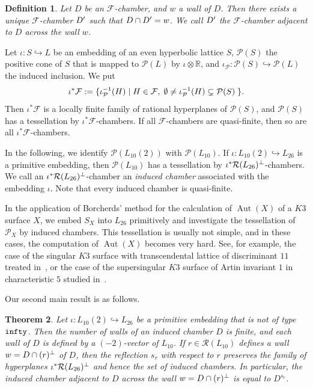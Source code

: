 \documentclass{amsart}
\newtheorem{theorem}{Theorem}[section]
\newtheorem{_definition}[theorem]{Definition}
\newenvironment{definition}{\begin{_definition}\rm}{\end{_definition}}
\numberwithin{equation}{section}
\numberwithin{table}{section}
\numberwithin{figure}{section}
\newcommand{\R}{\mathord{\mathbb R}}
\newcommand{\FFF}{\mathord{\mathcal F}}
\newcommand{\PPP}{\mathord{\mathcal P}}
\newcommand{\RRR}{\mathord{\mathcal R}}
\newcommand{\inj}{\hookrightarrow}
\newcommand{\set}[2]{\{ {#1}\mid {#2}  \}}
\newcommand{\tensor}{\otimes}
\newcommand{\sprime}{\sp\prime}
\newcommand{\sperp}{\sp{\perp}}
\newcommand{\inv}{\sp{-1}}
\newcommand{\Aut}{\operatorname{\mathrm{Aut}}\nolimits}
\begin{document}
%
\begin{definition}
Let $D$  be an $\FFF$-chamber, and $w$ a wall of $D$.
Then there exists a unique $\FFF$-chamber $D\sprime$ such that $D\cap D\sprime=w$.
We call $D\sprime$ the $\FFF$-chamber \emph{adjacent to $D$ across the wall $w$}.
\end{definition}
%
%
Let $\iota\colon S\inj L$ be an embedding
of an even hyperbolic lattice $S$,
$\PPP(S)$  the positive cone of $S$
that is mapped to $\PPP(L)$ by $\iota\tensor \R$,
and
$\iota_{\PPP}\colon \PPP(S)\inj \PPP(L)$
the induced inclusion.
We put
\[
\iota^{*} \FFF:=\set{\iota_{\PPP}\inv (H)}{H\in \FFF, \;
\emptyset\ne \iota_{\PPP}\inv (H) \subsetneq \PPP(S)\;
}.
\]
Then $\iota^{*} \FFF$ is a locally finite family of rational hyperplanes of $\PPP(S)$,
and $\PPP(S)$ has a tessellation by $\iota^{*} \FFF$-chambers.
If all $\FFF$-chambers are quasi-finite,
then so are all $\iota^{*}\FFF$-chambers.
%
\par
In the following,
we identify $\PPP(L_{10}(2))$ with $\PPP(L_{10})$.
If $\iota\colon L_{10}(2)\inj L_{26}$ is a primitive embedding,
then $\PPP(L_{10})$ has a tessellation by $\iota^{*} \RRR(L_{26})\sperp$-chambers.
We call an $\iota^{*} \RRR(L_{26})\sperp$-chamber
an \emph{induced chamber} associated with the embedding $\iota$.
Note that every induced chamber is quasi-finite.
%
\par
%
In the application of Borcherds' method for the calculation of $\Aut(X)$
of a $K3$ surface $X$,
we embed $S_X$ into $L_{26}$ primitively and investigate
the tessellation of $\PPP_X$ by induced chambers.
This tessellation
is usually not simple,
and in these cases, the computation of $\Aut(X)$ becomes very hard.
See, for example,  the case of the singular $K3$ surface with transcendental lattice
of discriminant $11$ treated in~\cite{Shimada2015},
or the case of the supersingular $K3$ surface of Artin invariant $1$ in characteristic $5$
studied in~\cite{KatsuraKondoShimada2014}.
%
\par
Our second main result is as follows.
%
\begin{theorem}\label{thm:simple}
Let $\iota\colon L_{10}(2)\inj L_{26}$ be a  primitive embedding
that is not of type ${\tt infty}$.
Then the  number of walls of an induced chamber $D$ is finite,
and  each wall of  $D$ is defined by a $(-2)$-vector of $L_{10}$.
If $r\in \RRR(L_{10})$ defines a wall $w=D\cap (r)\sperp$ of $D$,
then the reflection $s_r$ with respect to $r$  preserves
the family of hyperplanes $\iota\sp*\RRR(L_{26})\sperp$
and hence the set of induced chambers.
In particular, the induced chamber adjacent to $D$
across the wall $w=D\cap (r)\sperp$
is equal to  $D^{s_r}$.
\end{theorem}
\end{document}
